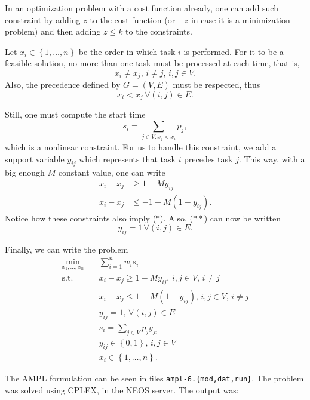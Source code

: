 \documentclass[a4paper]{report}
\begin{document}
In an optimization problem with a cost function already, one can add such constraint by adding $z$ to the cost function (or $-z$ in case it is a minimization problem) and then adding $z\le k$ to the constraints.



Let $x_i \in \left\{ 1,\ldots,n \right\} $ be the order in which task $i$ is performed. For it to be a feasible solution, no more than one task must be processed at each time, that is, \[
x_i \neq x_j ,\, i\neq j,\, i,j \in V \tag{$*$}
.\] Also, the precedence defined by $G=\left( V,E \right) $ must be respected, thus \[
x_i < x_j\,\forall \left( i,j \right) \in E \tag{$**$}
.\]

Still, one must compute the start time \[
s_i = \sum_{j \in V : x_j < x_i } p_j
,\] which is a nonlinear constraint. For us to handle this constraint, we add a support variable $y_{ij}$ which represents that task $i$ precedes task $j$. This way, with a big enough $M$ constant value, one can write
\begin{align*}
    x_i - x_j &\ge 1 - My_{ij} \\
    x_i - x_j &\le -1 + M \left( 1 -  y_{ij}\right)
.\end{align*}
Notice how these constraints also imply ($*$). Also, ($**$) can now be written \[
y_{ij} = 1\,\forall \left( i,j \right) \in E 
.\] 

Finally, we can write the problem
\begin{align*}
    \min_{x_1,\ldots,x_n} \quad & \sum_{i=1}^{n} w_i s_i \\
    \textrm{s.t.} \quad & x_i - x_j \ge 1 - My_{ij},\, i,j \in V ,\, i\neq j \\
      & x_i - x_j \le  1 - M \left( 1 - y_{ij}\right) ,\, i,j \in V ,\, i\neq j \\
      & y_{ij} = 1,\, \forall \left( i,j \right) \in E \\
      & s_i = \sum_{j \in V} p_j y_{ji} \\
      & y_{ij} \in \left\{ 0,1 \right\},\, i,j \in V \\
      & x_i \in \left\{ 1,\ldots,n \right\}
.\end{align*}

The AMPL formulation can be seen in files \texttt{ampl-6.\{mod,dat,run\}}. The problem was solved using CPLEX, in the NEOS server. The output was:
\end{document}
